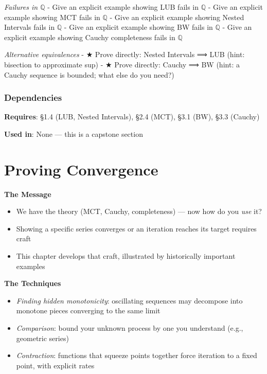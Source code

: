 \documentclass[
  10pt,
  letterpaper,
]{scrbook}
\providecommand{\tightlist}{%
  \setlength{\itemsep}{0pt}\setlength{\parskip}{0pt}}
\newcommand{\QQ}{\mathbb{Q}}
\begin{document}
\emph{Failures in \(\QQ\)} - Give an explicit example showing LUB fails
in \(\QQ\) - Give an explicit example showing MCT fails in \(\QQ\) -
Give an explicit example showing Nested Intervals fails in \(\QQ\) -
Give an explicit example showing BW fails in \(\QQ\) - Give an explicit
example showing Cauchy completeness fails in \(\QQ\)

\emph{Alternative equivalences} - ★ Prove directly: Nested Intervals ⟹
LUB (hint: bisection to approximate sup) - ★ Prove directly: Cauchy ⟹ BW
(hint: a Cauchy sequence is bounded; what else do you need?)

\subsection{Dependencies}\label{dependencies-14}

\textbf{Requires}: §1.4 (LUB, Nested Intervals), §2.4 (MCT), §3.1 (BW),
§3.3 (Cauchy)

\textbf{Used in}: None --- this is a capstone section

\chapter{Proving Convergence}\label{proving-convergence}

\textbf{The Message}

\begin{itemize}
\tightlist
\item
  We have the theory (MCT, Cauchy, completeness) --- now how do you
  \emph{use} it?
\item
  Showing a specific series converges or an iteration reaches its target
  requires craft
\item
  This chapter develops that craft, illustrated by historically
  important examples
\end{itemize}

\textbf{The Techniques}

\begin{itemize}
\tightlist
\item
  \emph{Finding hidden monotonicity}: oscillating sequences may
  decompose into monotone pieces converging to the same limit
\item
  \emph{Comparison}: bound your unknown process by one you understand
  (e.g., geometric series)
\item
  \emph{Contraction}: functions that squeeze points together force
  iteration to a fixed point, with explicit rates
\end{itemize}
\end{document}
